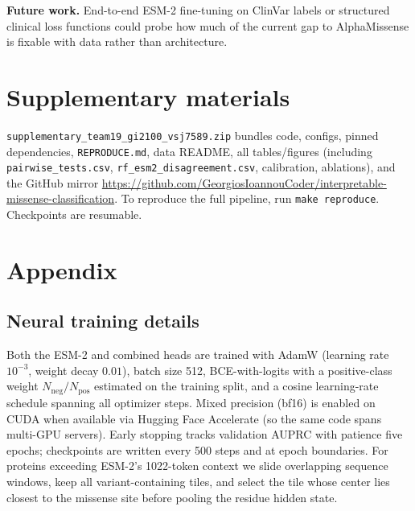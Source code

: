 \documentclass[11pt,letterpaper]{article}
\begin{document}
\textbf{Future work.} End-to-end ESM-2 fine-tuning on ClinVar labels or structured clinical loss functions could probe how much of the current gap to AlphaMissense is fixable with data rather than architecture.

\section*{Supplementary materials} \texttt{supplementary\_team19\_gi2100\_vsj7589.zip} bundles code, configs, pinned dependencies, \texttt{REPRODUCE.md}, data README, all tables/figures (including \texttt{pairwise\_tests.csv}, \texttt{rf\_esm2\_disagreement.csv}, calibration, ablations), and the GitHub mirror \url{https://github.com/GeorgiosIoannouCoder/interpretable-missense-classification}. To reproduce the full pipeline, run \texttt{make reproduce}. Checkpoints are resumable.




\appendix
\setcounter{figure}{0}
\renewcommand{\thefigure}{A\arabic{figure}}
\setcounter{table}{0}
\renewcommand{\thetable}{A\arabic{table}}
\section*{Appendix}

\subsection*{Neural training details}
\label{app:training_details}
Both the ESM-2 and combined heads are trained with AdamW (learning rate $10^{-3}$, weight decay $0.01$), batch size 512, BCE-with-logits with a positive-class weight $N_{\mathrm{neg}}/N_{\mathrm{pos}}$ estimated on the training split, and a cosine learning-rate schedule spanning all optimizer steps. Mixed precision (bf16) is enabled on CUDA when available via Hugging Face Accelerate (so the same code spans multi-GPU servers). Early stopping tracks validation AUPRC with patience five epochs; checkpoints are written every 500 steps and at epoch boundaries. For proteins exceeding ESM-2's 1022-token context we slide overlapping sequence windows, keep all variant-containing tiles, and select the tile whose center lies closest to the missense site before pooling the residue hidden state.
\end{document}
